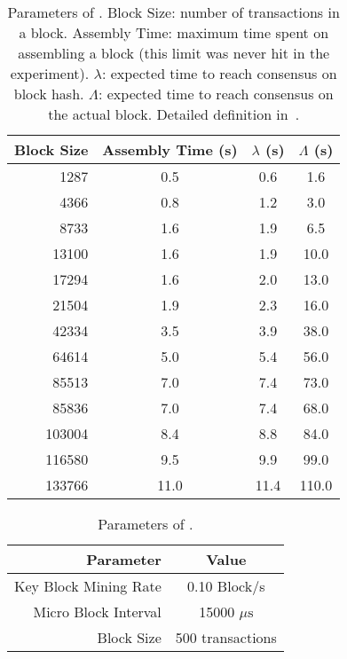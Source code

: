 \begin{table}[t]
	\centering
	\caption{Parameters of \algorand. Block Size: number of transactions in a block. Assembly Time: maximum time spent on assembling a block (this limit was never hit in the experiment). $\lambda$: expected time to reach consensus on block hash. $\Lambda$: expected time to reach consensus on the actual block. Detailed definition in~\cite{algorand}.}
	\begin{tabular}{ r | c | c | c } 
	 \hline
	 Block Size & Assembly Time (s) & $\lambda$ (s) & $\Lambda$ (s) \\ [0.5ex] 
	 \hline\hline
	 1287 & 0.5 & 0.6 & 1.6 \\
	 4366 & 0.8 & 1.2 & 3.0 \\
	 8733 & 1.6 & 1.9 & 6.5 \\
	 13100 & 1.6 & 1.9 & 10.0 \\
	 17294 & 1.6 & 2.0 & 13.0 \\
	 21504 & 1.9 & 2.3 & 16.0 \\
	 42334 & 3.5 & 3.9 & 38.0 \\
	 64614 & 5.0 & 5.4 & 56.0 \\
	 85513 & 7.0 & 7.4 & 73.0 \\
	 85836 & 7.0 & 7.4 & 68.0 \\
	 103004 & 8.4 & 8.8 & 84.0 \\
	 116580 & 9.5 & 9.9 & 99.0 \\
	 133766 & 11.0 & 11.4 & 110.0 \\
	 \hline
	\end{tabular}
\label{table:algorand-params}
\end{table}

\begin{table}[t]
	\centering
	\caption{Parameters of \bng.}
	\begin{tabular}{ r | c } 
	 \hline
	 Parameter & Value \\ [0.5ex] 
	 \hline\hline
	 Key Block Mining Rate & 0.10 Block/s \\
	 Micro Block Interval & 15000 $\mu\text{s}$ \\
	 Block Size & 500 transactions \\
	 \hline
	\end{tabular}
\label{table:bng-params}
\end{table}

